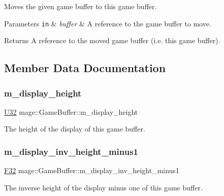 Moves the given game buffer to this game buffer.


\begin{DoxyParams}[1]{Parameters}
\mbox{\tt in}  & {\em buffer} & A reference to the game buffer to move. \\
\hline
\end{DoxyParams}
\begin{DoxyReturn}{Returns}
A reference to the moved game buffer (i.\+e. this game buffer). 
\end{DoxyReturn}


\subsection{Member Data Documentation}
\hypertarget{structmage_1_1_game_buffer_ad4543663789eebde08b8775759e40dec}{}\label{structmage_1_1_game_buffer_ad4543663789eebde08b8775759e40dec} 
\subsubsection{\texorpdfstring{m\+\_\+display\+\_\+height}{m\_display\_height}}
{\footnotesize\ttfamily \hyperlink{namespacemage_a41c104c036fba3756a74e19f793eeaa1}{U32} mage\+::\+Game\+Buffer\+::m\+\_\+display\+\_\+height}

The height of the display of this game buffer. \hypertarget{structmage_1_1_game_buffer_a1958156c6deefba5161e7aab7204a5ea}{}\label{structmage_1_1_game_buffer_a1958156c6deefba5161e7aab7204a5ea} 
\subsubsection{\texorpdfstring{m\+\_\+display\+\_\+inv\+\_\+height\+\_\+minus1}{m\_display\_inv\_height\_minus1}}
{\footnotesize\ttfamily \hyperlink{namespacemage_aa97e833b45f06d60a0a9c4fc22ae02c0}{F32} mage\+::\+Game\+Buffer\+::m\+\_\+display\+\_\+inv\+\_\+height\+\_\+minus1}

The inverse height of the display minus one of this game buffer. \hypertarget{structmage_1_1_game_buffer_a7db70b391fbf5ba58018d4f77ff06bba}{}\label{structmage_1_1_game_buffer_a7db70b391fbf5ba58018d4f77ff06bba} 
